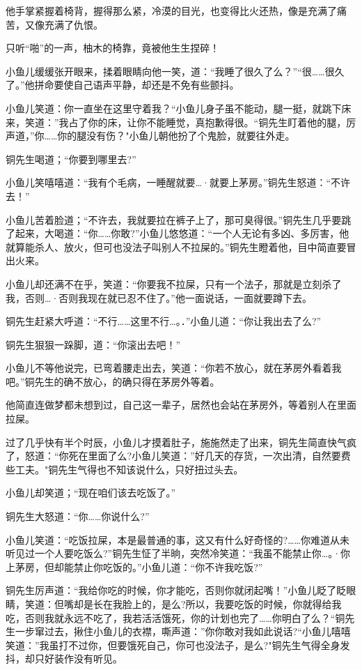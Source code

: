 \documentclass[12pt,oneside]{book}
\begin{document}
他手掌紧握着椅背，握得那么紧，冷漠的目光，也变得比火还热，像是充满了痛苦，又像充满了仇恨。

只听``啪''的一声，柚木的椅靠，竟被他生生捏碎！

小鱼儿缓缓张开眼来，揉着眼睛向他一笑，道：``我睡了很久了么？''``很\ldots\ldots 很久了。''他拼命要使自己语声平静，却还是不免有些颤抖。

小鱼儿笑道：你一直坐在这里守着我？``小鱼儿身子虽不能动，腿一挺，就跳下床来，笑道：''我占了你的床，让你不能睡觉，真抱歉得很。``铜先生盯着他的腿，厉声道，''你\ldots\ldots 你的腿没有伤？"小鱼儿朝他扮了个鬼脸，就要往外走。

铜先生喝道；``你要到哪里去?''

小鱼儿笑嘻嘻道：``我有个毛病，一睡醒就要\ldots·就要上茅房。''铜先生怒道：``不许去！''

小鱼儿苦着脸道；``不许去，我就要拉在裤子上了，那可臭得很。''铜先生几乎要跳了起来，大喝道：``你\ldots\ldots 你敢?''小鱼儿悠悠道：``一个人无论有多凶、多厉害，他就算能杀人、放火，但可也没法子叫别人不拉屎的。''铜先生瞪着他，目中简直要冒出火来。

小鱼儿却还满不在乎，笑道：``你要我不拉屎，只有一个法子，那就是立刻杀了我，否则\ldots·否则我现在就已忍不住了。''他一面说话，一面就要蹲下去。

铜先生赶紧大呼道：``不行\ldots\ldots 这里不行\ldots。．''小鱼儿道：``你让我出去了么?''

铜先生狠狠一跺脚，道：``你滚出去吧！''

小鱼儿不等他说完，已弯着腰走出去，笑道：``你若不放心，就在茅房外看着我吧。''铜先生的确不放心，的确只得在茅房外等着。

他简直连做梦都未想到过，自己这一辈子，居然也会站在茅房外，等着别人在里面拉屎。

过了几乎快有半个时辰，小鱼儿才摸着肚子，施施然走了出来，铜先生简直快气疯了，怒道：``你死在里面了么?小鱼儿笑道：''好几天的存货，一次出清，自然要费些工夫。"铜先生气得也不知该说什么，只好扭过头去。

小鱼儿却笑道；``现在咱们该去吃饭了。''

铜先生大怒道：``你\ldots\ldots 你说什么?''

小鱼儿笑道：``吃饭拉屎，本是最普通的事，这又有什么好奇怪的?\ldots\ldots 你难道从未听见过一个人要吃饭么?''铜先生怔了半晌，突然冷笑道：``我虽不能禁止你\ldots。·你上茅房，但却能禁止你吃饭的。''小鱼儿道：``你不许我吃饭?''

铜先生厉声道：``我给你吃的时候，你才能吃，否则你就闭起嘴！''小鱼儿眨了眨眼睛，笑道：但嘴却是长在我脸上的，是么?所以，我要吃饭的时候，你就得给我吃，否则我就永远不吃了，我若活活饿死，你的计划也完了\ldots\ldots 你明白了么？``铜先生一步窜过去，揪住小鱼儿的衣襟，嘶声道：''你你敢对我如此说话?``小鱼儿嘻嘻笑道：''我虽打不过你，但要饿死自己，你可也没法子，是么?"铜先生气得全身发抖，却只好装作没有听见。
\end{document}
